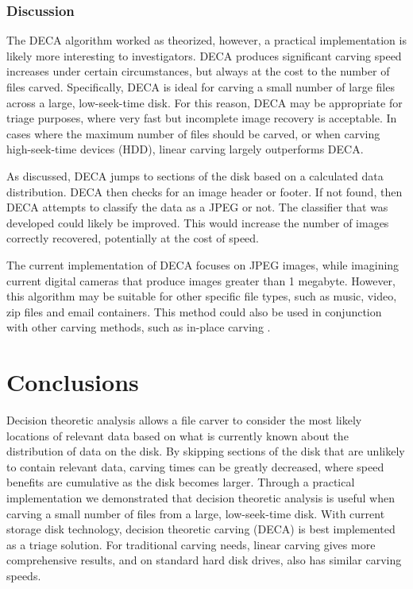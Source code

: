 \documentclass[final,5p,times,twocolumn,authoryear]{elsarticle}
\begin{document}
\subsubsection{Discussion}
The DECA algorithm worked as theorized, however, a practical implementation is likely more interesting to investigators. DECA produces significant carving speed increases under certain circumstances, but always at the cost to the number of files carved. Specifically, DECA is ideal for carving a small number of large files across a large, low-seek-time disk. For this reason, DECA may be appropriate for triage purposes, where very fast but incomplete image recovery is acceptable. In cases where the maximum number of files should be carved, or when carving high-seek-time devices (HDD), linear carving largely outperforms DECA.

As discussed, DECA jumps to sections of the disk based on a calculated data distribution. DECA then checks for an image header or footer. If not found, then DECA attempts to classify the data as a JPEG or not. The classifier that was developed could likely be improved. This would increase the number of images correctly recovered, potentially at the cost of speed.

The current implementation of DECA focuses on JPEG images, while imagining current digital cameras that produce images greater than 1 megabyte. However, this algorithm may be suitable for other specific file types, such as music, video, zip files and email containers. This method could also be used in conjunction with other carving methods, such as in-place carving \citep{Richard2007inplace, MeijerRob2012}.

\section{Conclusions}
Decision theoretic analysis allows a file carver to consider the most likely locations of relevant data based on what is currently known about the distribution of data on the disk. By skipping sections of the disk that are unlikely to contain relevant data, carving times can be greatly decreased, where speed benefits are cumulative as the disk becomes larger. Through a practical implementation we demonstrated that decision theoretic analysis is useful when carving a small number of files from a large, low-seek-time disk. With current storage disk technology, decision theoretic carving (DECA) is best implemented as a triage solution. For traditional carving needs, linear carving gives more comprehensive results, and on standard hard disk drives, also has similar carving speeds.
\end{document}
